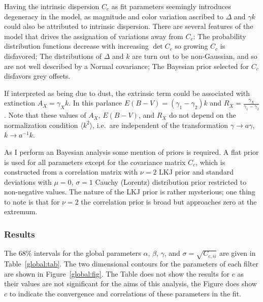 \documentclass[11pt, oneside]{article}   	%
\begin{document}
Having the intrinsic dispersion $C_c$ as fit parameters seemingly introduces degeneracy in the model, as magnitude and color variation
ascribed to $\Delta$ and $\gamma k$ could also be attributed to intrinsic dispersion.  There are several features of the model
that drives the assignation of variations away from $C_c$:  The probability distribution functions decrease
with increasing $\det{C_c}$ so growing $C_c$ is disfavored; The distributions of $\Delta$ and $k$ are turn out to
be non-Gaussian, and so are not well described by a Normal covariance; The Bayesian prior selected for $C_c$ disfavors
grey offsets.

If interpreted as being due to dust, the extrinsic term could be associated with extinction $A_X = \gamma_X k$.  In
this parlance $E(B-V) = (\gamma_1-\gamma_2) k$ and $R_X = \frac{\gamma_X}{\gamma_1-\gamma_2}$.
Note that these values of $A_X$, $E(B-V)$, and $R_X$ do not depend on the normalization condition $ \langle k^2 \rangle$, i.e.\
are independent of the transformation $\gamma \rightarrow a\gamma$, $k \rightarrow a^{-1} k$.

As I perform an Bayesian analysis some mention of priors is required.  A flat prior is used for all parameters except
for the covariance matrix $C_c$, which is constructed from a correlation matrix with  $\nu=2$  LKJ prior and standard
deviations with
 $\mu=0$, $\sigma=1$ Cauchy (Lorentz) distribution prior restricted to non-negative values.
The nature of the LKJ prior is rather mysterious; one thing to note is that for $\nu=2$ the correlation prior is broad but
approaches zero at the extremum.

\subsubsection{Results}
The 68\% intervals for the global parameters $\alpha$, $\beta$, $\gamma$, and $\sigma = \sqrt{C_{c,ii}}$  are given in Table~\ref{global:tab}.
The two dimensional contours for the parameters of each filter are shown in Figure~\ref{global:fig}.  The Table does not show
the results for $c$ as their values are not significant for the aims of this analysis, the Figure does show $c$ to indicate the convergence
and correlations of these parameters in the fit.
\end{document}
